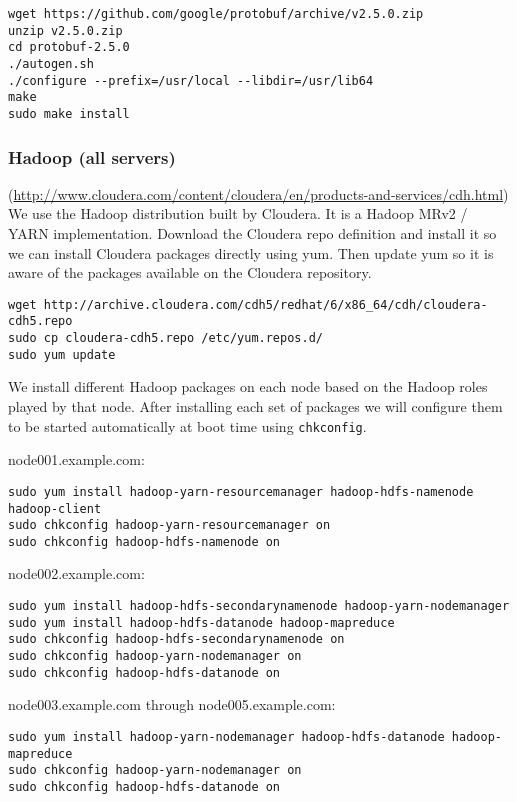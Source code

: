 \begin{verbatim}
wget https://github.com/google/protobuf/archive/v2.5.0.zip
unzip v2.5.0.zip
cd protobuf-2.5.0
./autogen.sh
./configure --prefix=/usr/local --libdir=/usr/lib64
make
sudo make install
\end{verbatim}

\subsubsection{Hadoop (all servers)} (\url{http://www.cloudera.com/content/cloudera/en/products-and-services/cdh.html})\\
We use the Hadoop distribution built by Cloudera.  It is a Hadoop MRv2 /
YARN implementation.  Download the Cloudera repo definition and install
it so we can install Cloudera packages directly using yum.  Then update
yum so it is aware of the packages available on the Cloudera repository.

\begin{verbatim}
wget http://archive.cloudera.com/cdh5/redhat/6/x86_64/cdh/cloudera-cdh5.repo
sudo cp cloudera-cdh5.repo /etc/yum.repos.d/
sudo yum update
\end{verbatim}

We install different Hadoop packages on each node based on the Hadoop roles
played by that node.  After installing each set of packages we will configure
them to be started automatically at boot time using \verb|chkconfig|.

node001.example.com:
\begin{verbatim}
sudo yum install hadoop-yarn-resourcemanager hadoop-hdfs-namenode hadoop-client
sudo chkconfig hadoop-yarn-resourcemanager on
sudo chkconfig hadoop-hdfs-namenode on
\end{verbatim}

node002.example.com:
\begin{verbatim}
sudo yum install hadoop-hdfs-secondarynamenode hadoop-yarn-nodemanager
sudo yum install hadoop-hdfs-datanode hadoop-mapreduce
sudo chkconfig hadoop-hdfs-secondarynamenode on
sudo chkconfig hadoop-yarn-nodemanager on
sudo chkconfig hadoop-hdfs-datanode on
\end{verbatim}

node003.example.com through node005.example.com:
\begin{verbatim}
sudo yum install hadoop-yarn-nodemanager hadoop-hdfs-datanode hadoop-mapreduce
sudo chkconfig hadoop-yarn-nodemanager on
sudo chkconfig hadoop-hdfs-datanode on
\end{verbatim}

